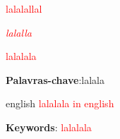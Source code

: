 \documentclass[
12pt,				%
openright,			%
oneside,			%
a4paper,			%
english, %
french, %
spanish, %
brazil %
]{abntex2}
\begin{document}
	
	
	\frenchspacing 
	
	
	\imprimircapa
	
	\imprimirfolhaderosto*
	
	\begin{agradecimentos}
\textcolor{red}{lalalallal}
		
        
		
		
	\end{agradecimentos}
	
	\begin{epigrafe}
		\vspace*{\fill}
		\begin{flushright}
			\textit{ \textcolor{red}{lalalla}	}
		\end{flushright}
	\end{epigrafe}
	
	\setlength{\absparsep}{18pt} %
	\begin{resumo}
		[Resumo]
                \textcolor{red}{lalalala}
		
		\textbf{Palavras-chave}:lalala
	\end{resumo}
	
	\begin{resumo}[Abstract]
		\begin{otherlanguage*}{english}
	 \textcolor{red}{lalalala in english}
			
			\vspace{\onelineskip}
			
			\noindent 
			\textbf{Keywords}: \textcolor{red}{lalalala}
		\end{otherlanguage*}
	\end{resumo}
	
	\listoffigures* 
    
	\cleardoublepage
	

	
	
\end{document}
